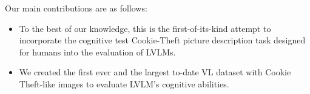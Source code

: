 
Our main contributions are as follows:

\begin{itemize}
	\item To the best of our knowledge, this is the first-of-its-kind
attempt to incorporate the cognitive test Cookie-Theft picture description task designed for humans into the evaluation 
of LVLMs.
	\item 
We created the first ever and the largest to-date VL dataset with Cookie Theft-like 
images to evaluate LVLM's cognitive abilities. 

\end{itemize}

